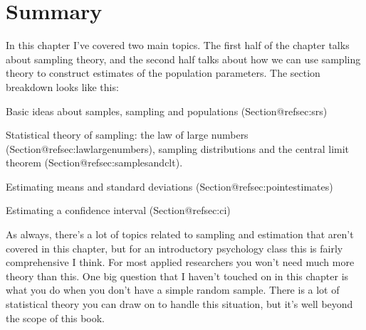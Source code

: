 \section{Summary}

In this chapter I've covered two main topics. The first half of the chapter talks about sampling theory, and the second half talks about how we can use sampling theory to construct estimates of the population parameters. The section breakdown looks like this:

 \itemsep -2pt
\item Basic ideas about samples, sampling and populations (Section@refsec:srs)
\item Statistical theory of sampling: the law of large numbers (Section@refsec:lawlargenumbers), sampling distributions and the central limit theorem (Section@refsec:samplesandclt).
\item Estimating means and standard deviations (Section@refsec:pointestimates)
\item Estimating a confidence interval (Section@refsec:ci)



As always, there's a lot of topics related to sampling and estimation that aren't covered in this chapter, but for an introductory psychology class this is fairly comprehensive I think. For most applied researchers you won't need much more theory than this. One big question that I haven't touched on in this chapter is what you do when you don't have a simple random sample. There is a lot of statistical theory you can draw on to handle this situation, but it's well beyond the scope of this book.

